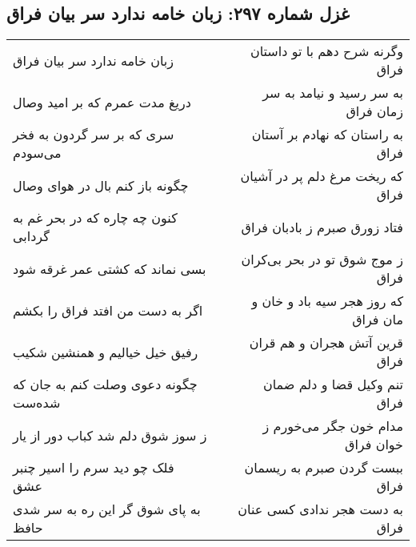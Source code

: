 \begin{center}
\section*{غزل شماره ۲۹۷: زبان خامه ندارد سر بیان فراق}
\label{sec:sh297}
\begin{longtable}{l p{0.5cm} r}
زبان خامه ندارد سر بیان فراق
&&
وگرنه شرح دهم با تو داستان فراق
\\
دریغ مدت عمرم که بر امید وصال
&&
به سر رسید و نیامد به سر زمان فراق
\\
سری که بر سر گردون به فخر می‌سودم
&&
به راستان که نهادم بر آستان فراق
\\
چگونه باز کنم بال در هوای وصال
&&
که ریخت مرغ دلم پر در آشیان فراق
\\
کنون چه چاره که در بحر غم به گردابی
&&
فتاد زورق صبرم ز بادبان فراق
\\
بسی نماند که کشتی عمر غرقه شود
&&
ز موج شوق تو در بحر بی‌کران فراق
\\
اگر به دست من افتد فراق را بکشم
&&
که روز هجر سیه باد و خان و مان فراق
\\
رفیق خیل خیالیم و همنشین شکیب
&&
قرین آتش هجران و هم قران فراق
\\
چگونه دعوی وصلت کنم به جان که شده‌ست
&&
تنم وکیل قضا و دلم ضمان فراق
\\
ز سوز شوق دلم شد کباب دور از یار
&&
مدام خون جگر می‌خورم ز خوان فراق
\\
فلک چو دید سرم را اسیر چنبر عشق
&&
ببست گردن صبرم به ریسمان فراق
\\
به پای شوق گر این ره به سر شدی حافظ
&&
به دست هجر ندادی کسی عنان فراق
\\
\end{longtable}
\end{center}

